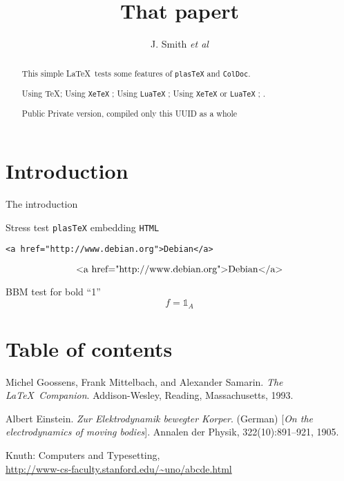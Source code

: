 \documentclass[a4paper]{article}
\newif\ifplastex\plastexfalse
\newcommand\mathbbm[1]{{\mathbb{#1}}}
\begin{document}
\author{J. Smith
\emph{et al}
}
\title{That papert}
\maketitle
\section*{Introduction}
The introduction

\begin{abstract}
  This simple \LaTeX\ tests some features
  of \texttt{plasTeX} and \texttt{ColDoc}.

  \ifetex Using  \TeX \fi ;
  \ifxetex Using \texttt{XeTeX} \fi ;
  \ifluatex Using \texttt{LuaTeX} \fi ;
  \iftutex Using \texttt{XeTeX} or \texttt{LuaTeX} \fi ;
  \ifplastex Using \texttt{plasTeX} \fi .

  \ifColDocPublic Public \else Private \fi
  version, compiled
  \ifColDocOneUUID only this UUID \else as a whole \fi
\end{abstract}

Stress test  \texttt{plasTeX} embedding \texttt{HTML}
\begin{verbatim}
<a href="http://www.debian.org">Debian</a>
\end{verbatim}
\[ \hbox{<a href="http://www.debian.org">Debian</a>} \]

BBM test for bold ``1''
\[f={\mathbbm{1}}_A\]





\section*{Table of contents}
\tableofcontents




\begin{thebibliography}{9}
Michel Goossens, Frank Mittelbach, and Alexander Samarin. 
\textit{The \LaTeX\ Companion}. 
Addison-Wesley, Reading, Massachusetts, 1993.

Albert Einstein. 
\textit{Zur Elektrodynamik bewegter Korper}. (German) 
[\textit{On the electrodynamics of moving bodies}]. 
Annalen der Physik, 322(10):891–921, 1905.

Knuth: Computers and Typesetting,
\\ \url{http://www-cs-faculty.stanford.edu/~uno/abcde.html}
\end{thebibliography}
\end{document}

